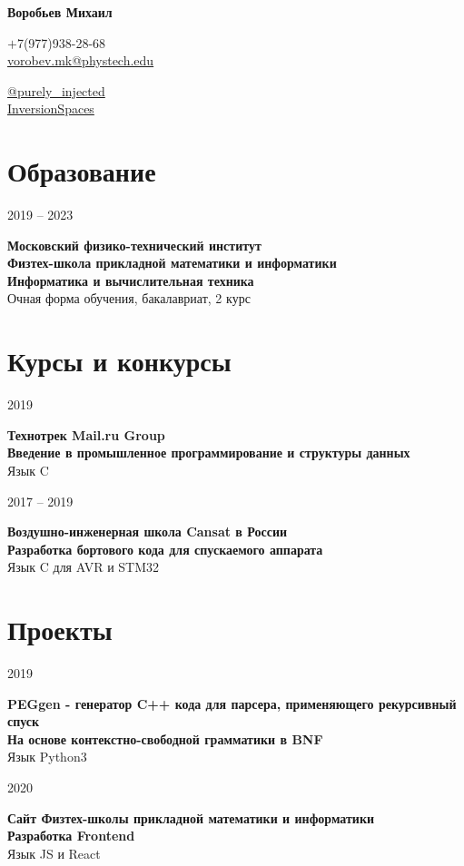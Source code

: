\documentclass{article}
\makeatletter
\renewcommand{\maketitle}{
    \Huge
    \begin{center}
        \textbf{Воробьев Михаил}
    \end{center}

    \large
    \begin{minipage}{0.4\textwidth}
        \faMobile \hspace{0.1cm} $\boldsymbol{+}$7(977)938-28-68\\[0.3em]
        \faEnvelope \hspace{0.1cm} \href{mailto:vorobev.mk@phystech.edu}{vorobev.mk@phystech.edu}
    \end{minipage}
    \hfill
    \begin{minipage}{0.4\textwidth}
        \begin{flushright}
            \faPaperPlane \hspace{0.1cm} \href{https://t.me/purely_injected}{@purely\_injected}\\[0.3em]
            \faGithub \hspace{0.1cm} \href{https://github.com/InversionSpaces}{InversionSpaces}
        \end{flushright}
    \end{minipage}
}
\newcommand{\entry}[3]{
    \begin{minipage}[t]{.11\linewidth}
        \hfill \textsc{#1}
    \end{minipage}
    \hfill\vline\hfill
    \begin{minipage}[t]{.80\linewidth}
        \textbf{#2}\\
        \footnotesize{#3}
    \end{minipage}
}
\makeatother
\begin{document}
    \maketitle
    \small
    
    \section{Образование}
        \entry {2019 -- 2023}
        {Московский физико-технический институт\\
         Физтех-школа прикладной математики и информатики\\
         Информатика и вычислительная техника}
        {Очная форма обучения, бакалавриат, 2 курс}


    \section{Курсы и конкурсы}
        \entry {2019}
        {Технотрек Mail.ru Group\\
        Введение в промышленное программирование и структуры данных}
        {Язык C}

        \vspace{.2cm}

        \entry {2017 -- 2019}
        {Воздушно-инженерная школа Cansat в России\\
        Разработка бортового кода для спускаемого аппарата}
        {Язык C для AVR и STM32}        

    \section{Проекты}
    \entry {2019}
    {PEGgen - генератор C++ кода для парсера, применяющего рекурсивный спуск\\
    На основе контекстно-свободной грамматики в BNF
    }
    {Язык Python3} 
    
    \vspace{.2cm}
    
    \entry {2020}
    {Сайт Физтех-школы прикладной математики и информатики\\
    Разработка Frontend}
    {Язык JS и React}
\end{document}
